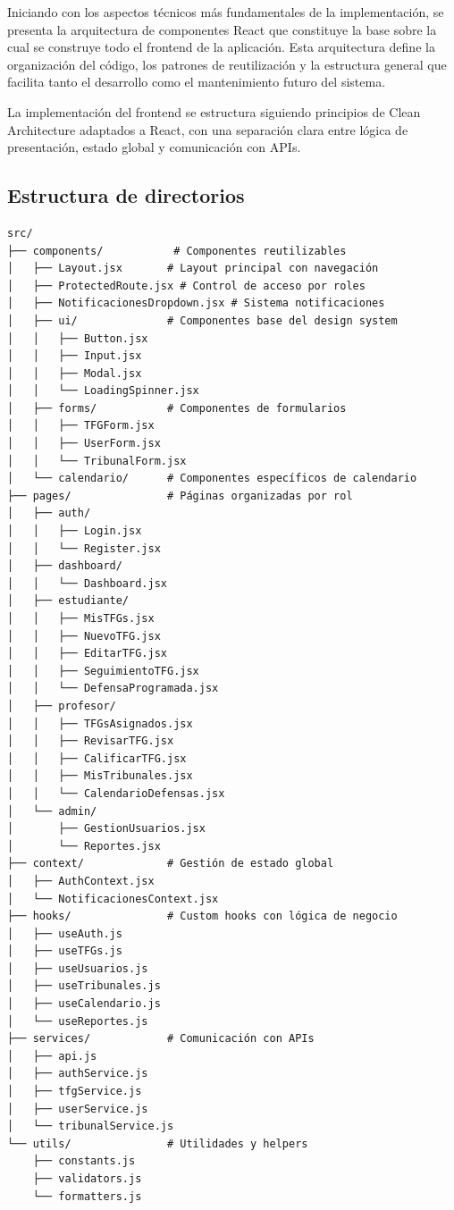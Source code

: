 \documentclass[12pt,a4paper,oneside]{report}
\begin{document}
Iniciando con los aspectos técnicos más fundamentales de la
implementación, se presenta la arquitectura de componentes React que
constituye la base sobre la cual se construye todo el frontend de la
aplicación. Esta arquitectura define la organización del código, los
patrones de reutilización y la estructura general que facilita tanto el
desarrollo como el mantenimiento futuro del sistema.

La implementación del frontend se estructura siguiendo principios de
Clean Architecture adaptados a React, con una separación clara entre
lógica de presentación, estado global y comunicación con APIs.

\subsection{Estructura de directorios}\label{estructura-de-directorios}

\begin{lstlisting}
src/
├── components/           # Componentes reutilizables
│   ├── Layout.jsx       # Layout principal con navegación
│   ├── ProtectedRoute.jsx # Control de acceso por roles
│   ├── NotificacionesDropdown.jsx # Sistema notificaciones
│   ├── ui/              # Componentes base del design system
│   │   ├── Button.jsx
│   │   ├── Input.jsx
│   │   ├── Modal.jsx
│   │   └── LoadingSpinner.jsx
│   ├── forms/           # Componentes de formularios
│   │   ├── TFGForm.jsx
│   │   ├── UserForm.jsx
│   │   └── TribunalForm.jsx
│   └── calendario/      # Componentes específicos de calendario
├── pages/               # Páginas organizadas por rol
│   ├── auth/
│   │   ├── Login.jsx
│   │   └── Register.jsx
│   ├── dashboard/
│   │   └── Dashboard.jsx
│   ├── estudiante/
│   │   ├── MisTFGs.jsx
│   │   ├── NuevoTFG.jsx
│   │   ├── EditarTFG.jsx
│   │   ├── SeguimientoTFG.jsx
│   │   └── DefensaProgramada.jsx
│   ├── profesor/
│   │   ├── TFGsAsignados.jsx
│   │   ├── RevisarTFG.jsx
│   │   ├── CalificarTFG.jsx
│   │   ├── MisTribunales.jsx
│   │   └── CalendarioDefensas.jsx
│   └── admin/
│       ├── GestionUsuarios.jsx
│       └── Reportes.jsx
├── context/             # Gestión de estado global
│   ├── AuthContext.jsx
│   └── NotificacionesContext.jsx
├── hooks/               # Custom hooks con lógica de negocio
│   ├── useAuth.js
│   ├── useTFGs.js
│   ├── useUsuarios.js
│   ├── useTribunales.js
│   ├── useCalendario.js
│   └── useReportes.js
├── services/            # Comunicación con APIs
│   ├── api.js
│   ├── authService.js
│   ├── tfgService.js
│   ├── userService.js
│   └── tribunalService.js
└── utils/               # Utilidades y helpers
    ├── constants.js
    ├── validators.js
    └── formatters.js
\end{lstlisting}
\end{document}
